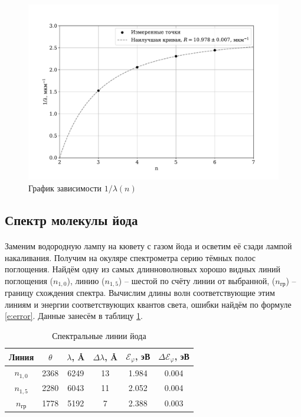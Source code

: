 \documentclass[a4paper,12pt]{article} %
\begin{document}
\begin{figure}
\centering
\includegraphics[width=\textwidth]{ridberg.pdf}
\caption{График зависимости $1/\lambda(n)$}
\label{fig:ridberg}
\end{figure}

\subsection{Спектр молекулы йода}

\paragraph{} Заменим водородную лампу на кювету с газом йода и осветим её сзади лампой накаливания. Получим на окуляре спектрометра серию тёмных полос поглощения. Найдём одну из самых длинноволновых хорошо видных линий поглощения ($n_{1, 0}$), линию ($n_{1, 5}$) -- шестой по счёту линии от выбранной, ($n_\text{гр}$) -- границу схождения спектра. Вычислим длины волн соответствующие этим линиям и энергии соответствующих квантов света, ошибки найдём по формуле \eqref{e:error}. Данные занесём в таблицу \ref{tab:i_spectrum}.

\begin{table}[]
\centering
\begin{tabular}{|c|c|c|c|c|c|}
\hline
Линия & $\theta$ & $\lambda$, Å & $\Delta \lambda$, Å & $\mathcal{E}_\varphi$, эВ & $\Delta \mathcal{E}_\varphi$, эВ \\ \hline
$n_{1, 0}$    & 2368 & 6249 & 13 & 1.984 & 0.004 \\ \hline
$n_{1, 5}$    & 2280 & 6043 & 11 & 2.052 & 0.004 \\ \hline
$n_\text{гр}$ & 1778 & 5192 & 7  & 2.388 & 0.003 \\ \hline
\end{tabular}
\caption{Спектральные линии йода}
\label{tab:i_spectrum}
\end{table}
\end{document}
